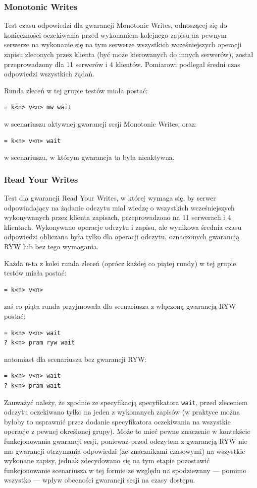 \subsubsection*{Monotonic Writes}

Test czasu odpowiedzi dla gwarancji Monotonic Writes, odnoszącej się do konieczności oczekiwania przed wykonaniem kolejnego zapisu na pewnym serwerze na wykonanie się na tym serwerze wszystkich wcześniejszych operacji zapisu zleconych przez klienta (być może kierowanych do innych serwerów), został przeprowadzony dla 11 serwerów i 4 klientów. Pomiarowi podlegał średni czas odpowiedzi wszystkich żądań.

Runda zleceń w tej grupie testów miała postać:
\begin{lstlisting}
= k<n> v<n> mw wait
\end{lstlisting}
w scenariuszu aktywnej gwarancji sesji Monotonic Writes, oraz:
\begin{lstlisting}
= k<n> v<n> wait
\end{lstlisting}
w scenariuszu, w którym gwarancja ta była nieaktywna.

\subsubsection*{Read Your Writes}

Test dla gwarancji Read Your Writes, w której wymaga się, by serwer odpowiadający na żądanie odczytu miał wiedzę o wszystkich wcześniejszych wykonywanych przez klienta zapisach, przeprowadzono na 11 serwerach i 4 klientach. Wykonywano operacje odczytu i zapisu, ale wynikowa średnia czasu odpowiedzi obliczana była tylko dla operacji odczytu, oznaczonych gwarancją RYW lub bez tego wymagania.

Każda \texttt{n}-ta z kolei runda zleceń (oprócz każdej co piątej rundy) w tej grupie testów miała postać:
\begin{lstlisting}
= k<n> v<n>
\end{lstlisting}
zaś co piąta runda przyjmowała dla scenariusza z włączoną gwarancją RYW postać:
\begin{lstlisting}
= k<n> v<n> wait
? k<n> pram ryw wait
\end{lstlisting}
natomiast dla scenariusza bez gwarancji RYW:
\begin{lstlisting}
= k<n> v<n> wait
? k<n> pram wait
\end{lstlisting}
Zauważyć należy, że zgodnie ze specyfikacją specyfikatora \texttt{wait}, przed zleceniem odczytu oczekiwano tylko na jeden z wykonanych zapisów (w praktyce można byłoby to usprawnić przez dodanie specyfikatora oczekiwania na wszystkie operacje z pewnej określonej grupy). Może to mieć pewne znaczenie w kontekście funkcjonowania gwarancji sesji, ponieważ przed odczytem z gwarancją RYW nie ma gwarancji otrzymania odpowiedzi (ze znacznikami czasowymi) na wszystkie wykonane zapisy, jednak zdecydowano się na tym etapie pozostawić funkcjonowanie scenariusza w tej formie ze względu na spodziewany --- pomimo wszystko --- wpływ obecności gwarancji sesji na czasy dostępu.


